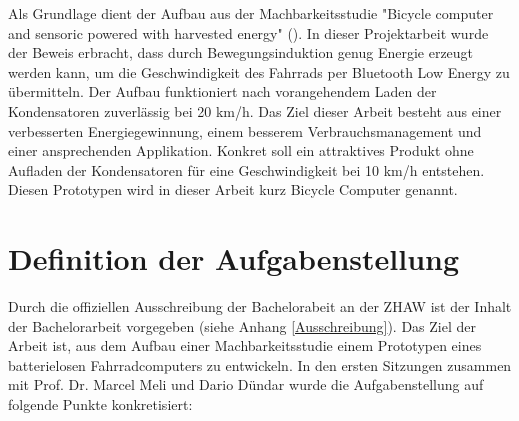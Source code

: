 Als Grundlage dient der Aufbau aus der Machbarkeitsstudie "Bicycle computer and sensoric powered with harvested energy" (\cite{PA_bicycle}). In dieser Projektarbeit wurde der Beweis erbracht, dass durch Bewegungsinduktion genug Energie erzeugt werden kann, um die Geschwindigkeit des Fahrrads per Bluetooth Low Energy zu übermitteln. Der Aufbau funktioniert nach vorangehendem Laden der Kondensatoren zuverlässig bei 20 km/h. Das Ziel dieser Arbeit besteht aus einer verbesserten Energiegewinnung, einem besserem Verbrauchsmanagement und einer ansprechenden Applikation. Konkret soll ein attraktives Produkt ohne Aufladen der Kondensatoren für eine Geschwindigkeit bei 10 km/h entstehen. Diesen Prototypen wird in dieser Arbeit kurz Bicycle Computer genannt.



\section{Definition der Aufgabenstellung}\label{Aufgabenstellung} 

Durch die offiziellen Ausschreibung der Bachelorabeit an der ZHAW ist der Inhalt der Bachelorarbeit vorgegeben (siehe Anhang \ref{Ausschreibung}). Das Ziel der Arbeit ist, aus dem Aufbau einer Machbarkeitsstudie einem Prototypen eines batterielosen Fahrradcomputers zu entwickeln. In den ersten Sitzungen zusammen mit Prof. Dr. Marcel Meli und Dario Dündar wurde die Aufgabenstellung auf folgende Punkte konkretisiert:

